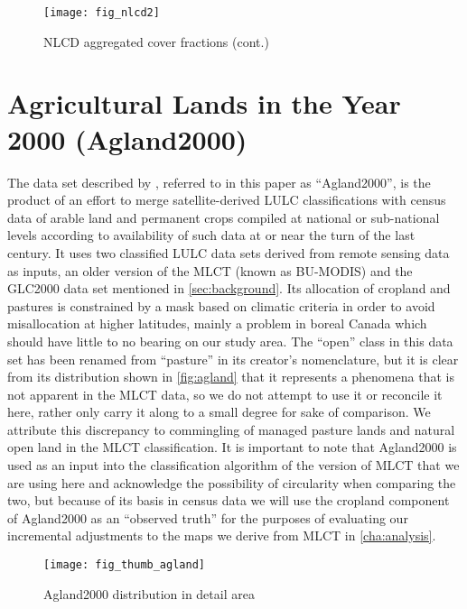\begin{figure}[hpt] 
  \centering
  
  \texttt{[image: fig\_nlcd2]}
\caption{NLCD aggregated cover fractions (cont.)}
\label{fig:nlcd2}
\end{figure} 


\section{Agricultural Lands in the Year 2000 (Agland2000)}
\label{sec:agland2000}


The data set described by \citet{Ramankutty2008}, referred to in this
paper as ``Agland2000'', is the product of an effort to merge
satellite-derived LULC classifications with census data of arable land
and permanent crops compiled at national or sub-national levels
according to availability of such data at or near the turn of the last
century.  It uses two classified LULC data sets derived from remote
sensing data as inputs, an older version of the MLCT (known as
BU-MODIS) and the GLC2000 data set mentioned in
\autoref{sec:background}.  Its allocation of cropland and pastures is
constrained by a mask based on climatic criteria in order to avoid
misallocation at higher latitudes, mainly a problem in boreal Canada
which should have little to no bearing on our study area.  The
``open'' class in this data set has been renamed from ``pasture'' in
its creator's nomenclature, but it is clear from its distribution
shown in \autoref{fig:agland} that it represents a phenomena that is
not apparent in the MLCT data, so we do not attempt to use it or
reconcile it here, rather only carry it along to a small degree for
sake of comparison.  We attribute this discrepancy to commingling of
managed pasture lands and natural open land in the MLCT
classification.  It is important to note that Agland2000 is used as an
input into the classification algorithm of the version of MLCT that we
are using here and acknowledge the possibility of circularity when
comparing the two, but because of its basis in census data we will use
the cropland component of Agland2000 as an ``observed truth'' for the
purposes of evaluating our incremental adjustments to the maps we
derive from MLCT in \autoref{cha:analysis}.
  

\begin{figure}[hpt]
\centering
  

\texttt{[image: fig\_thumb\_agland]}
 
\caption{Agland2000 distribution in detail area}
\label{fig:thumb_agland} 
\end{figure} 

